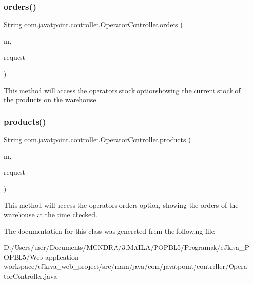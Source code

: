 \subsubsection{\texorpdfstring{orders()}{orders()}}
{\footnotesize\ttfamily String com.\+javatpoint.\+controller.\+Operator\+Controller.\+orders (\begin{DoxyParamCaption}\item[{Model}]{m,  }\item[{Web\+Request}]{request }\end{DoxyParamCaption})\hspace{0.3cm}{\ttfamily [inline]}}

This method will access the operator\textquotesingle{}s \textquotesingle{}stock\textquotesingle{} optionshowing the current stock of the products on the warehouse. \mbox{\label{classcom_1_1javatpoint_1_1controller_1_1_operator_controller_acd0e1143c0636d600fa748930b2ed18a}} 
\subsubsection{\texorpdfstring{products()}{products()}}
{\footnotesize\ttfamily String com.\+javatpoint.\+controller.\+Operator\+Controller.\+products (\begin{DoxyParamCaption}\item[{Model}]{m,  }\item[{Web\+Request}]{request }\end{DoxyParamCaption})\hspace{0.3cm}{\ttfamily [inline]}}

This method will access the operator\textquotesingle{}s \textquotesingle{}orders\textquotesingle{} option, showing the orders of the warehouse at the time checked. 

The documentation for this class was generated from the following file\+:\begin{DoxyCompactItemize}
\item 
D\+:/\+Users/user/\+Documents/\+M\+O\+N\+D\+R\+A/3.\+M\+A\+I\+L\+A/\+P\+O\+P\+B\+L5/\+Programak/e\+Jkiva\+\_\+\+P\+O\+P\+B\+L5/\+Web application workspace/e\+Jkiva\+\_\+web\+\_\+project/src/main/java/com/javatpoint/controller/Operator\+Controller.\+java\end{DoxyCompactItemize}
